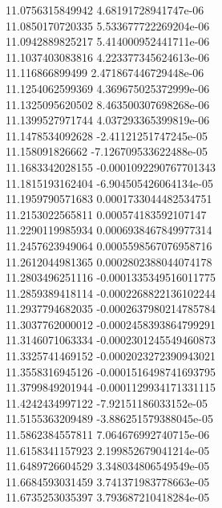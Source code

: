 {11.0756315849942 4.68191728941747e-06 \\
11.0850170720335 5.533677722269204e-06 \\
11.0942889825217 5.414000952441711e-06 \\
11.1037403083816 4.223377345624613e-06 \\
11.116866899499 2.471867446729448e-06 \\
11.1254062599369 4.369675025372999e-06 \\
11.1325095620502 8.463500307698268e-06 \\
11.1399527971744 4.037293365399819e-06 \\
11.1478534092628 -2.41121251747245e-05 \\
11.158091826662 -7.126709533622488e-05 \\
11.1683342028155 -0.0001092290767701343 \\
11.1815193162404 -6.904505426064134e-05 \\
11.1959790571683 0.0001733044482534751 \\
11.2153022565811 0.000574183592107147 \\
11.2290119985934 0.0006938467849977314 \\
11.2457623949064 0.0005598567076958716 \\
11.2612044981365 0.0002802388044074178 \\
11.2803496251116 -0.0001335349516011775 \\
11.2859389418114 -0.0002268822136102244 \\
11.2937794682035 -0.0002637980214785784 \\
11.3037762000012 -0.0002458393864799291 \\
11.3146071063334 -0.0002301245549460873 \\
11.3325741469152 -0.0002023272390943021 \\
11.3558316945126 -0.0001516498741693795 \\
11.3799849201944 -0.0001129934171331115 \\
11.4242434997122 -7.92151186033152e-05 \\
11.5155363209489 -3.886251579388045e-05 \\
11.5862384557811 7.064676992740715e-06 \\
11.6158341157923 2.199852679041214e-05 \\
11.6489726604529 3.348034806549549e-05 \\
11.6684593031459 3.741371983778663e-05 \\
11.6735253035397 3.793687210418284e-05 \\
}
